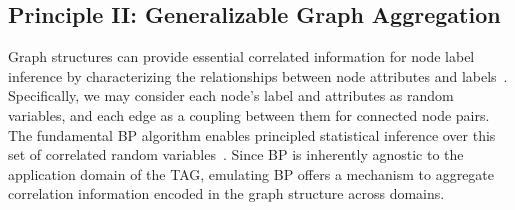 







\subsection{Principle II: Generalizable Graph  Aggregation} \label{sec:principle2}
Graph structures can provide essential correlated information for node label inference by characterizing the relationships between node attributes and labels~\cite{zhu2003semi,kipf2016semi,velivckovic2017graph,hamilton2017inductive,zhu2020beyond,wei2022understanding}.
 Specifically, we may consider each node's label and attributes as random variables, and each edge as a coupling between them for connected node pairs. The fundamental BP algorithm enables principled statistical inference over this set of correlated random variables~\cite{murphy2013loopy}. Since BP is inherently agnostic to the application domain of the TAG, emulating BP offers a mechanism to aggregate correlation information encoded in the graph structure across domains.

